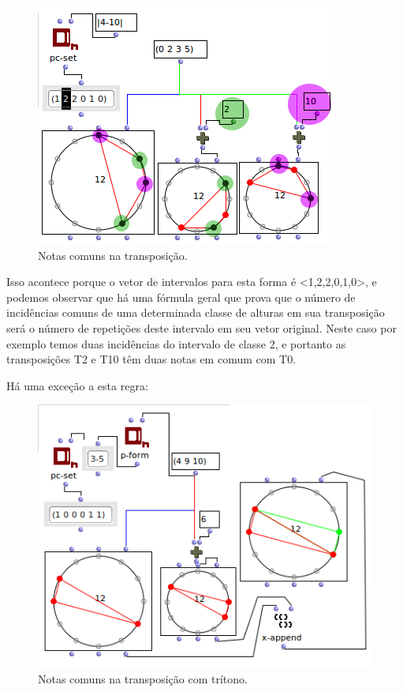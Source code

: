 \documentclass[
	12pt,				%
	openright,			%
	twoside,			%
	a4paper,			%
	english,			%
	french,				%
	spanish,			%
	brazil				%
	]{abntex2}
\begin{document}
\begin{figure}[!h]
	\caption{\label{fig_grafico}Notas comuns na transposição. }
	\begin{center}
	    \includegraphics[scale=0.7]{OM_settheory/notas_comuns_2e10.png}
	\end{center}
\end{figure}



Isso acontece porque o vetor de intervalos para esta forma é <1,2,2,0,1,0>, e podemos observar que há uma fórmula geral que prova que o número de incidências comuns de uma determinada classe de alturas em sua transposição será o número de repetições deste intervalo em seu vetor original. Neste caso por exemplo temos duas incidências do intervalo de classe 2, e portanto as transposições T2 e T10 têm duas notas em comum com T0.

Há uma exceção a esta regra:
 
\begin{figure}[!h]
	\caption{\label{fig_grafico}Notas comuns na transposição com trítono. }
	\begin{center}
	    \includegraphics[scale=0.7]{OM_settheory/notas_comuns_tritono.png}
	\end{center}
\end{figure}
\end{document}
